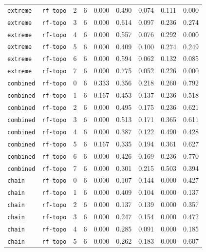 \documentclass{article}
\begin{document}
\begin{center}
\begin{tabular}{lllcccccc}
\texttt{extreme} & \texttt{rf-topo} & 2 & 6 & 0.000 & 0.490 & 0.074 & 0.111 & 0.000 \\
\texttt{extreme} & \texttt{rf-topo} & 3 & 6 & 0.000 & 0.614 & 0.097 & 0.236 & 0.274 \\
\texttt{extreme} & \texttt{rf-topo} & 4 & 6 & 0.000 & 0.557 & 0.076 & 0.292 & 0.000 \\
\texttt{extreme} & \texttt{rf-topo} & 5 & 6 & 0.000 & 0.409 & 0.100 & 0.274 & 0.249 \\
\texttt{extreme} & \texttt{rf-topo} & 6 & 6 & 0.000 & 0.594 & 0.062 & 0.132 & 0.085 \\
\texttt{extreme} & \texttt{rf-topo} & 7 & 6 & 0.000 & 0.775 & 0.052 & 0.226 & 0.000 \\
\texttt{combined} & \texttt{rf-topo} & 0 & 6 & 0.333 & 0.356 & 0.218 & 0.260 & 0.792 \\
\texttt{combined} & \texttt{rf-topo} & 1 & 6 & 0.167 & 0.453 & 0.137 & 0.236 & 0.518 \\
\texttt{combined} & \texttt{rf-topo} & 2 & 6 & 0.000 & 0.495 & 0.175 & 0.236 & 0.621 \\
\texttt{combined} & \texttt{rf-topo} & 3 & 6 & 0.000 & 0.513 & 0.171 & 0.365 & 0.611 \\
\texttt{combined} & \texttt{rf-topo} & 4 & 6 & 0.000 & 0.387 & 0.122 & 0.490 & 0.428 \\
\texttt{combined} & \texttt{rf-topo} & 5 & 6 & 0.167 & 0.335 & 0.194 & 0.361 & 0.627 \\
\texttt{combined} & \texttt{rf-topo} & 6 & 6 & 0.000 & 0.426 & 0.169 & 0.236 & 0.770 \\
\texttt{combined} & \texttt{rf-topo} & 7 & 6 & 0.000 & 0.301 & 0.215 & 0.503 & 0.394 \\
\texttt{chain} & \texttt{rf-topo} & 0 & 6 & 0.000 & 0.107 & 0.144 & 0.000 & 0.427 \\
\texttt{chain} & \texttt{rf-topo} & 1 & 6 & 0.000 & 0.409 & 0.104 & 0.000 & 0.137 \\
\texttt{chain} & \texttt{rf-topo} & 2 & 6 & 0.000 & 0.137 & 0.139 & 0.000 & 0.357 \\
\texttt{chain} & \texttt{rf-topo} & 3 & 6 & 0.000 & 0.247 & 0.154 & 0.000 & 0.472 \\
\texttt{chain} & \texttt{rf-topo} & 4 & 6 & 0.000 & 0.285 & 0.091 & 0.000 & 0.185 \\
\texttt{chain} & \texttt{rf-topo} & 5 & 6 & 0.000 & 0.262 & 0.183 & 0.000 & 0.607 \\
\bottomrule
\end{tabular}
\end{center}
\end{document}
